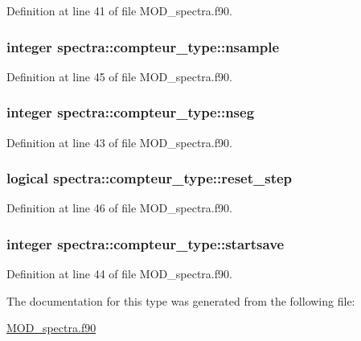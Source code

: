 Definition at line 41 of file M\-O\-D\-\_\-spectra.\-f90.

\hypertarget{structspectra_1_1compteur__type_a5f2a7e2a86ec1f850d5a942a07ca9e1c}{
\subsubsection[{nsample}]{\setlength{\rightskip}{0pt plus 5cm}integer spectra\-::compteur\-\_\-type\-::nsample}}\label{structspectra_1_1compteur__type_a5f2a7e2a86ec1f850d5a942a07ca9e1c}


Definition at line 45 of file M\-O\-D\-\_\-spectra.\-f90.

\hypertarget{structspectra_1_1compteur__type_a6c0f1d4829d48d67a9ccffe6b69b93fd}{
\subsubsection[{nseg}]{\setlength{\rightskip}{0pt plus 5cm}integer spectra\-::compteur\-\_\-type\-::nseg}}\label{structspectra_1_1compteur__type_a6c0f1d4829d48d67a9ccffe6b69b93fd}


Definition at line 43 of file M\-O\-D\-\_\-spectra.\-f90.

\hypertarget{structspectra_1_1compteur__type_aeda7736b7039ec7881e3710582c6e448}{
\subsubsection[{reset\-\_\-step}]{\setlength{\rightskip}{0pt plus 5cm}logical spectra\-::compteur\-\_\-type\-::reset\-\_\-step}}\label{structspectra_1_1compteur__type_aeda7736b7039ec7881e3710582c6e448}


Definition at line 46 of file M\-O\-D\-\_\-spectra.\-f90.

\hypertarget{structspectra_1_1compteur__type_ae1d9b74d8cece740d322012af7a081fd}{
\subsubsection[{startsave}]{\setlength{\rightskip}{0pt plus 5cm}integer spectra\-::compteur\-\_\-type\-::startsave}}\label{structspectra_1_1compteur__type_ae1d9b74d8cece740d322012af7a081fd}


Definition at line 44 of file M\-O\-D\-\_\-spectra.\-f90.



The documentation for this type was generated from the following file\-:\begin{DoxyCompactItemize}
\item 
\hyperlink{MOD__spectra_8f90}{M\-O\-D\-\_\-spectra.\-f90}\end{DoxyCompactItemize}
